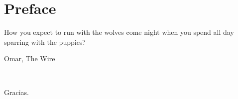 
{}
\setcounter{footnote}{0}
\chapter*{\textbf{Preface}}
\epigraph{
How you expect to run with the wolves come night when you spend all day sparring with the puppies?
}{Omar, The Wire}
\lipsum\\[0.5cm]



\begin{flushright}
Gracias.
\end{flushright}
